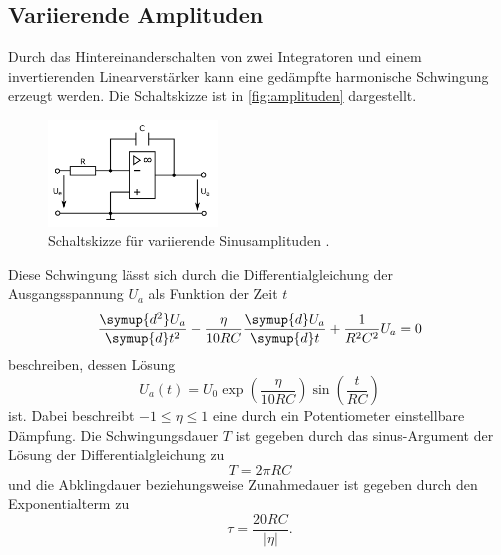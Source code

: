 \subsection{Variierende Amplituden}
Durch das Hintereinanderschalten von zwei Integratoren und einem invertierenden Linearverstärker
kann eine gedämpfte harmonische Schwingung erzeugt werden. Die Schaltskizze ist in 
\autoref{fig:amplituden} dargestellt.
\begin{figure}[H]
    \centering
    \includegraphics[width=0.4\textwidth]{integrator.png}
    \caption{Schaltskizze für variierende Sinusamplituden \cite{anleitung}.}
    \label{fig:amplituden}
\end{figure}
Diese Schwingung lässt sich durch die Differentialgleichung der Ausgangsspannung $U_a$ als Funktion der Zeit $t$
\begin{equation*}
    \frac{\symup{d^2} U_a}{\symup{d} t^2} - \frac{\eta}{10 R C} \frac{\symup{d} U_a}{\symup{d} t} + \frac{1}{R^2 C^2} U_a = 0
\end{equation*}
beschreiben, dessen Lösung 
\begin{equation*}
    U_a (t) = U_0 \exp \left( \frac{\eta}{10 R C} \right) \sin \left(\frac{t}{R C} \right)
\end{equation*}
ist.
Dabei beschreibt $ -1 \leq \eta \leq 1 $ eine durch ein Potentiometer einstellbare Dämpfung.
Die Schwingungsdauer $T$ ist gegeben durch das sinus-Argument der Lösung der Differentialgleichung zu
\begin{equation*}
    T = 2 \pi R C
\end{equation*}
und die Abklingdauer beziehungsweise Zunahmedauer ist gegeben durch den Exponentialterm zu
\begin{equation*}
    \tau = \frac{20 R C}{\vert \eta \vert}.
\end{equation*}
